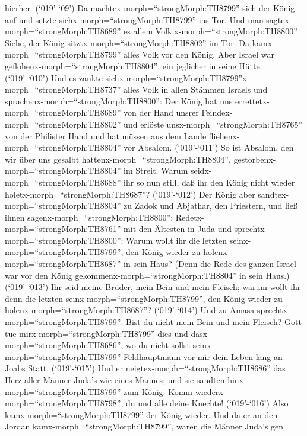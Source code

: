hierher.  (`019'-`09') Da
machtex-morph=``strongMorph:TH8799'' sich der König auf und setzte
sichx-morph=``strongMorph:TH8799'' ins Tor. Und man
sagtex-morph=``strongMorph:TH8689'' es allem
Volk:x-morph=``strongMorph:TH8800'' Siehe, der König
sitztx-morph=``strongMorph:TH8802'' im Tor. Da
kamx-morph=``strongMorph:TH8799'' alles Volk vor den König. Aber Israel
war geflohenx-morph=``strongMorph:TH8804'', ein jeglicher in seine
Hütte.  (`019'-`010') Und es zankte
sichx-morph=``strongMorph:TH8799''x-morph=``strongMorph:TH8737'' alles
Volk in allen Stämmen Israels und
sprachenx-morph=``strongMorph:TH8800'': Der König hat uns
errettetx-morph=``strongMorph:TH8689'' von der Hand unsrer
Feindex-morph=``strongMorph:TH8802'' und erlöste
unsx-morph=``strongMorph:TH8765'' von der Philister Hand und hat müssen
aus dem Lande fliehenx-morph=``strongMorph:TH8804'' vor Absalom.
 (`019'-`011') So ist Absalom, den wir über uns gesalbt
hattenx-morph=``strongMorph:TH8804'',
gestorbenx-morph=``strongMorph:TH8804'' im Streit. Warum
seidx-morph=``strongMorph:TH8688'' ihr so nun still, daß ihr den König
nicht wieder holetx-morph=``strongMorph:TH8687''? 
(`019'-`012') Der König aber sandtex-morph=``strongMorph:TH8804'' zu
Zadok und Abjathar, den Priestern, und ließ ihnen
sagenx-morph=``strongMorph:TH8800'': Redetx-morph=``strongMorph:TH8761''
mit den Ältesten in Juda und sprechtx-morph=``strongMorph:TH8800'':
Warum wollt ihr die letzten seinx-morph=``strongMorph:TH8799'', den
König wieder zu holenx-morph=``strongMorph:TH8687'' in sein Haus? (Denn
die Rede des ganzen Israel war vor den König
gekommenx-morph=``strongMorph:TH8804'' in sein Haus.) 
(`019'-`013') Ihr seid meine Brüder, mein Bein und mein Fleisch; warum
wollt ihr denn die letzten seinx-morph=``strongMorph:TH8799'', den König
wieder zu holenx-morph=``strongMorph:TH8687''? 
(`019'-`014') Und zu Amasa sprechtx-morph=``strongMorph:TH8799'': Bist
du nicht mein Bein und mein Fleisch? Gott tue
mirx-morph=``strongMorph:TH8799'' dies und
dasx-morph=``strongMorph:TH8686'', wo du nicht sollst
seinx-morph=``strongMorph:TH8799'' Feldhauptmann vor mir dein Leben lang
an Joabs Statt.  (`019'-`015') Und er
neigtex-morph=``strongMorph:TH8686'' das Herz aller Männer Juda's wie
eines Mannes; und sie sandten hinx-morph=``strongMorph:TH8799'' zum
König: Komm wiederx-morph=``strongMorph:TH8798'', du und alle deine
Knechte!  (`019'-`016') Also
kamx-morph=``strongMorph:TH8799'' der König wieder. Und da er an den
Jordan kamx-morph=``strongMorph:TH8799'', waren die Männer Juda's gen
